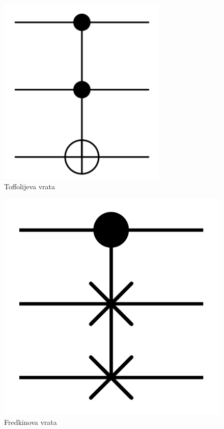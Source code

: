 \begin{figure}[H]
\centering
\includegraphics[scale=0.35]{img/CCNOT.png}
\caption{Toffolijeva vrata} 
\end{figure}
\begin{figure}[H]
\centering
\includegraphics[scale=0.09]{img/CSWAP.png}
\caption{Fredkinova vrata} 
\end{figure}

